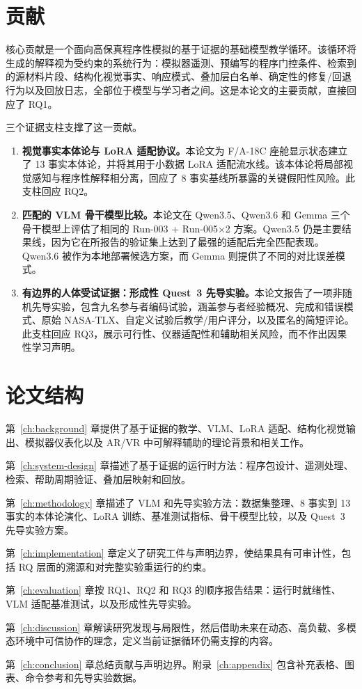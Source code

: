 \section{贡献}\label{sec:intro-contributions}

核心贡献是一个面向高保真程序性模拟的基于证据的基础模型教学循环。该循环将生成的解释视为受约束的系统行为：模拟器遥测、预编写的程序门控条件、检索到的源材料片段、结构化视觉事实、响应模式、叠加层白名单、确定性的修复/回退行为以及回放日志，全部位于模型与学习者之间。这是本论文的主要贡献，直接回应了 RQ1。

三个证据支柱支撑了这一贡献。

\begin{enumerate}
\item \textbf{视觉事实本体论与 LoRA 适配协议。}本论文为 F/A-18C 座舱显示状态建立了 13 事实本体论，并将其用于小数据 LoRA 适配流水线。该本体论将局部视觉感知与程序性解释相分离，回应了 8 事实基线所暴露的关键假阳性风险。此支柱回应 RQ2。

\item \textbf{匹配的 VLM 骨干模型比较。}本论文在 Qwen3.5、Qwen3.6 和 Gemma 三个骨干模型上评估了相同的 Run-003 + Run-005×2 方案。Qwen3.5 仍是主要结果线，因为它在所报告的验证集上达到了最强的适配后完全匹配表现。Qwen3.6 被作为本地部署候选方案，而 Gemma 则提供了不同的对比误差模式。

\item \textbf{有边界的人体受试证据：形成性 Quest~3 先导实验。}本论文报告了一项非随机先导实验，包含九名参与者编码试验，涵盖参与者经验概况、完成和错误模式、原始 NASA-TLX、自定义试验后教学/用户评分，以及匿名的简短评论。此支柱回应 RQ3，展示可行性、仪器适配性和辅助相关风险，而不作出因果性学习声明。
\end{enumerate}

\section{论文结构}\label{sec:intro-structure}

第~\ref{ch:background} 章提供了基于证据的教学、VLM、LoRA 适配、结构化视觉输出、模拟器仪表化以及 AR/VR 中可解释辅助的理论背景和相关工作。

第~\ref{ch:system-design} 章描述了基于证据的运行时方法：程序包设计、遥测处理、检索、帮助周期验证、叠加层映射和回放。

第~\ref{ch:methodology} 章描述了 VLM 和先导实验方法：数据集整理、8 事实到 13 事实的本体论演化、LoRA 训练、基准测试指标、骨干模型比较，以及 Quest~3 先导实验方案。

第~\ref{ch:implementation} 章定义了研究工件与声明边界，使结果具有可审计性，包括 RQ 层面的溯源和对完整实验重运行的约束。

第~\ref{ch:evaluation} 章按 RQ1、RQ2 和 RQ3 的顺序报告结果：运行时就绪性、VLM 适配基准测试，以及形成性先导实验。

第~\ref{ch:discussion} 章解读研究发现与局限性，然后借助未来在动态、高负载、多模态环境中可信协作的理念，定义当前证据循环仍需支撑的内容。

第~\ref{ch:conclusion} 章总结贡献与声明边界。附录~\ref{ch:appendix} 包含补充表格、图表、命令参考和先导实验数据。
